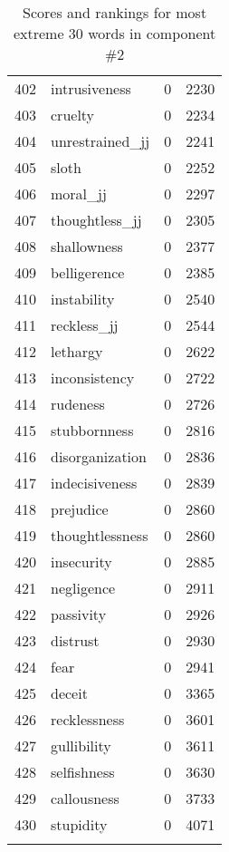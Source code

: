 \begin{longtable}[!htbp]{| rlr@{.}l |}
    402 & intrusiveness & 0 & 2230 \\
    403 & cruelty & 0 & 2234 \\
    404 & unrestrained\_jj & 0 & 2241 \\
    405 & sloth & 0 & 2252 \\
    406 & moral\_jj & 0 & 2297 \\
    407 & thoughtless\_jj & 0 & 2305 \\
    408 & shallowness & 0 & 2377 \\
    409 & belligerence & 0 & 2385 \\
    410 & instability & 0 & 2540 \\
    411 & reckless\_jj & 0 & 2544 \\
    412 & lethargy & 0 & 2622 \\
    413 & inconsistency & 0 & 2722 \\
    414 & rudeness & 0 & 2726 \\
    415 & stubbornness & 0 & 2816 \\
    416 & disorganization & 0 & 2836 \\
    417 & indecisiveness & 0 & 2839 \\
    418 & prejudice & 0 & 2860 \\
    419 & thoughtlessness & 0 & 2860 \\
    420 & insecurity & 0 & 2885 \\
    421 & negligence & 0 & 2911 \\
    422 & passivity & 0 & 2926 \\
    423 & distrust & 0 & 2930 \\
    424 & fear & 0 & 2941 \\
    425 & deceit & 0 & 3365 \\
    426 & recklessness & 0 & 3601 \\
    427 & gullibility & 0 & 3611 \\
    428 & selfishness & 0 & 3630 \\
    429 & callousness & 0 & 3733 \\
    430 & stupidity & 0 & 4071 \\
    \hline
    \caption{Scores and rankings for most extreme 30 words in component \#2} \\
\end{longtable}
